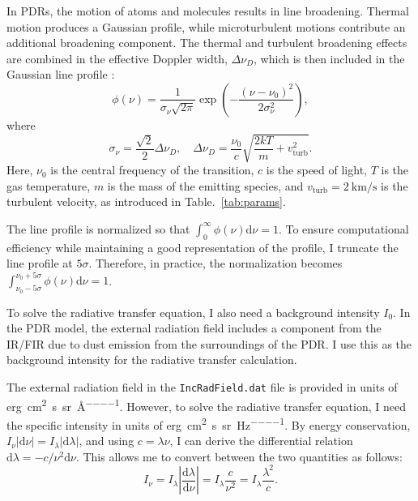 \documentclass[12pt,a4paper]{article}
\newcommand{\mr}{\mathrm}
\newcommand{\dd}[1]{\mathrm{d}#1}
\newcommand{\mdpdr}{\texttt{MeudonPDR} code}
\newcommand{\qt}[1]{}
\begin{document}
In PDRs, the motion of atoms and molecules results in line broadening. Thermal motion produces a Gaussian profile, while microturbulent motions contribute an additional broadening component. The thermal and turbulent broadening effects are combined in the effective Doppler width, $\Delta \nu_D$, which is then included in the Gaussian line profile \parencite[see, e.g.,][Eqs.~10.68-10.72]{Rybicki1979}:
\begin{equation}
    \phi(\nu) = \frac{1}{\sigma_\nu \sqrt{2 \pi}}\exp\left(-\frac{(\nu - \nu_0)^2}{2 \sigma_\nu^2}\right),
\end{equation}
where
\begin{equation}
    \sigma_\nu = \frac{\sqrt{2}}{2}\Delta \nu_D, \quad \Delta \nu_D = \frac{\nu_0}{c}\sqrt{\frac{2 k T}{m} + v_\mr{turb}^2}.
\end{equation}
Here, $\nu_0$ is the central frequency of the transition, $c$ is the speed of light, $T$ is the gas temperature, $m$ is the mass of the emitting species, and $v_\mr{turb} = \qty{2}{\km\per\second}$ is the turbulent velocity, as introduced in Table.~\ref{tab:params}.

The line profile is normalized so that $\int_0^{\infty} \phi(\nu) \dd{\nu} = 1$. To ensure computational efficiency while maintaining a good representation of the profile, I truncate the line profile at $5\sigma$. Therefore, in practice, the normalization becomes $\int_{\nu_0 - 5\sigma}^{\nu_0 + 5\sigma}\phi(\nu) \dd{\nu} = 1$.


To solve the radiative transfer equation, I also need a background intensity $I_0$. In the PDR model, the external radiation field includes a component from the IR/FIR due to dust emission from the surroundings of the PDR. I use this as the background intensity for the radiative transfer calculation.

The external radiation field in the \texttt{IncRadField.dat} file is provided in units of \unit{erg\per\centi\meter\squared\per\second\per\steradian\per\AA}. However, to solve the radiative transfer equation, I need the specific intensity in units of \unit{erg\per\centi\meter\squared\per\second\per\steradian\per\Hz}. By energy conservation, $I_\nu |\dd{\nu}| = I_\lambda |\dd{\lambda}|$, and using $c = \lambda\nu$, I can derive the differential relation $\dd{\lambda} = -c/\nu^2 \dd{\nu}$. This allows me to convert between the two quantities as follows:
\begin{equation}
    I_\nu = I_\lambda \left|\frac{\dd{\lambda}}{\dd{\nu}}\right| = I_\lambda \frac{c}{\nu^2} = I_\lambda \frac{\lambda^2}{c}.
\end{equation}
\end{document}
